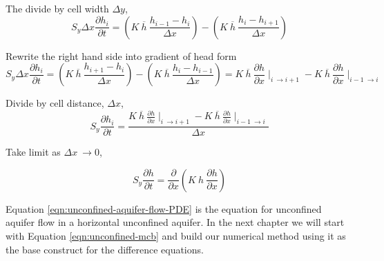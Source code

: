 The divide by cell width $\Delta y $,
 \begin{equation}
S_{y} \Delta x  \frac{\partial h_i}{\partial t} = 
(K  ~\overline{h}~ \frac{h_{i-1} - h_{i}}{\Delta x}) - 
(K  ~\overline{h}~ \frac{h_{i} - h_{i+1}}{\Delta x})
\end{equation}

Rewrite the right hand side into gradient of head form
 \begin{equation}
S_{y} \Delta x  \frac{\partial h_i}{\partial t} = 
(K ~\overline{h}~ \frac{h_{i+1} - h_{i}}{\Delta x}) - 
(K ~\overline{h}~ \frac{h_{i} - h_{i-1}}{\Delta x})
= 
{K ~\overline{h}~ \frac{\partial h}{\partial x}}\mid_{i~\rightarrow i+1} -
{K ~\overline{h}~ \frac{\partial h}{\partial x}}\mid_{i-1~\rightarrow i}
\label{eqn:unconfined-mcb}
\end{equation}

Divide by cell distance, $\Delta x$,
 \begin{equation}
S_{y}   \frac{\partial h_i}{\partial t} = 
\frac{{K ~\overline{h}~ \frac{\partial h}{\partial x}}\mid_{i~\rightarrow i+1} -
{K ~\overline{h}~ \frac{\partial h}{\partial x}}\mid_{i-1~\rightarrow i}}{\Delta x}
\end{equation}

Take limit as $\Delta x~\rightarrow0$, 

\begin{equation}
S_{y}   \frac{\partial h}{\partial t} = 
\frac{\partial}{\partial x}({K ~{h}~ \frac{\partial h}{\partial x}})
\label{eqn:unconfined-aquifer-flow} 
\end{equation}

Equation \ref{eqn:unconfined-aquifer-flow-PDE} is the equation for unconfined aquifer flow in a horizontal unconfined aquifer.  
In the next chapter we will start with Equation \ref{eqn:unconfined-mcb} and build our numerical method using it as the base construct for the difference equations.

